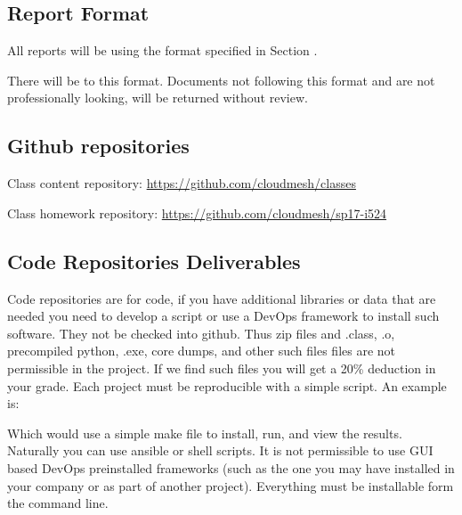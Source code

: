 \subsection{Report Format}
\label{\detokenize{i524/index:report-format}}
All reports will be using the format specified in Section {\hyperref[\detokenize{lesson/doc/report:reports}]{}}.

There will be  to this format. Documents not following
this format and are not professionally looking, will be returned
without review.


\subsection{Github repositories}
\label{\detokenize{i524/index:github-repositories}}
Class content repository: \url{https://github.com/cloudmesh/classes}

Class homework repository: \url{https://github.com/cloudmesh/sp17-i524}


\subsection{Code Repositories Deliverables}
\label{\detokenize{i524/index:code-repositories-deliverables}}
Code repositories are for code, if you have additional libraries or
data that are needed you need to develop a script or use a DevOps
framework to install such software. They  not be checked into
github. Thus zip files and .class, .o, precompiled python, .exe, core
dumps, and other such files files are not permissible in the
project. If we find such files you will get a 20\% deduction in your
grade. Each project must be reproducible with a simple script. An
example is:

\begin{sphinxVerbatim}[commandchars=\\\{\}]
  
 
 
 
\end{sphinxVerbatim}

Which would use a simple make file to install, run, and view the
results. Naturally you can use ansible or shell scripts. It is not
permissible to use GUI based DevOps preinstalled frameworks (such as
the one you may have installed in your company or as part of another
project). Everything must be installable form the command line.


